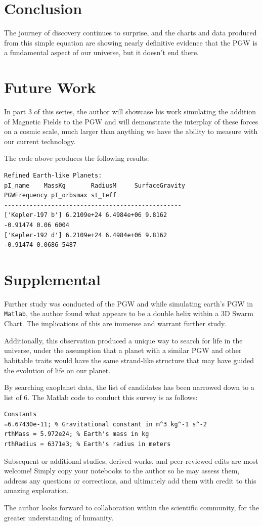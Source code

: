\documentclass[12pt]{article}
\begin{document}
\section*{Conclusion}

The journey of discovery continues to surprise, and the charts and data produced from this simple equation are showing nearly definitive evidence that the PGW is a fundamental aspect of our universe, but it doesn’t end there.

\section*{Future Work}

In part 3 of this series, the author will showcase his work simulating the addition of Magnetic Fields to the PGW and will demonstrate the interplay of these forces on a cosmic scale, much larger than anything we have the ability to measure with our current technology.

The code above produces the following results:

\begin{verbatim}
Refined Earth-like Planets:
pI_name    MassKg       RadiusM     SurfaceGravity
PGWFrequency pI_orbsmax st_teff
-------------------------------------------------
['Kepler-197 b'] 6.2109e+24 6.4984e+06 9.8162
-0.91474 0.06 6004
['Kepler-192 d'] 6.2109e+24 6.4984e+06 9.8162
-0.91474 0.0686 5487
\end{verbatim}

\section*{Supplemental}

Further study was conducted of the PGW and while simulating earth's PGW in \texttt{Matlab}, the author found what appears to be a double helix within a 3D Swarm Chart. The implications of this are immense and warrant further study.

Additionally, this observation produced a unique way to search for life in the universe, under the assumption that a planet with a similar PGW and other habitable traits would have the same strand-like structure that may have guided the evolution of life on our planet.

By searching exoplanet data, the list of candidates has been narrowed down to a list of 6. The Matlab code to conduct this survey is as follows:

\begin{verbatim}
Constants
=6.67430e-11; % Gravitational constant in m^3 kg^-1 s^-2
rthMass = 5.972e24; % Earth's mass in kg
rthRadius = 6371e3; % Earth's radius in meters
\end{verbatim}

Subsequent or additional studies, derived works, and peer-reviewed edits are most welcome! Simply copy your notebooks to the author so he may assess them, address any questions or corrections, and ultimately add them with credit to this amazing exploration.

The author looks forward to collaboration within the scientific community, for the greater understanding of humanity.
\end{document}
